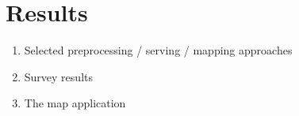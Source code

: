 \section{Results}

\begin{enumerate}
	\item Selected preprocessing / serving / mapping approaches
	\item Survey results
	\item The map application
\end{enumerate}
